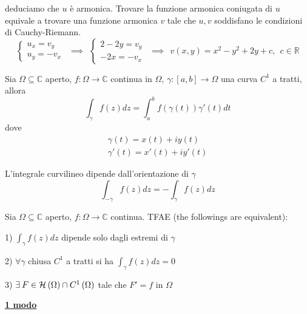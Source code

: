 deduciamo che $u$ è armonica. Trovare la funzione armonica coniugata di $u$ equivale a trovare una funzione armonica $v$ tale che $u,v$ soddisfano le condizioni di Cauchy-Riemann.
\begin{equation*}
\begin{cases}
u_{x} =v_{y}\\
u_{y} =-v_{x}
\end{cases} \ \ \implies \ \ \begin{cases}
2-2y=v_{y}\\
-2x=-v_{x}
\end{cases} \ \ \implies \ \ v\left( x,y\right) =x^{2} -y^{2} +2y+c,\ \ c\in \mathbb{R}
\end{equation*}
\Soluzione
\begin{defn}
Sia $\Omega \subseteq \mathbb{C}$ aperto, $f:\Omega \rightarrow \mathbb{C}$ continua in $\Omega $, $\gamma :\left[ a,b\right]\rightarrow \Omega $ una curva $C^{1}$ a tratti, allora
\begin{equation*}
\int\nolimits _{\gamma } f\left( z\right) dz=\int\nolimits ^{b}_{a} f\left( \gamma \left( t\right)\right) \gamma '\left( t\right) dt
\end{equation*}
dove
\begin{gather*}
\gamma \left( t\right) =x\left( t\right) +iy\left( t\right)\\
\gamma '\left( t\right) =x'\left( t\right) +iy'\left( t\right)
\end{gather*}
\end{defn}
\begin{rem}
L'integrale curvilineo dipende dall'orientazione di $\gamma $
\begin{equation*}
\int\nolimits _{-\gamma } f\left( z\right) dz=-\int\nolimits _{\gamma } f\left( z\right) dz
\end{equation*}
\end{rem}
\begin{thm}
Sia $\Omega \subseteq \mathbb{C}$ aperto, $f:\Omega \rightarrow \mathbb{C}$ continua. TFAE (the followings are equivalent):

1) $\int _{\gamma } f\left( z\right) dz$ dipende solo dagli estremi di $\gamma $

2) $\forall \gamma $ chiusa $C^{1}$ a tratti si ha $\int _{\gamma } f\left( z\right) dz=0$

3) $\exists F\in \Hc \left( \Omega \right) \cap C^{1}\left( \Omega \right)$ tale che $F'=f$ in $\Omega $
\end{thm}
\textbf{\underline{1 modo}}
